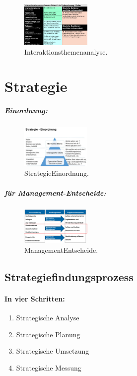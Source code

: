 \documentclass{article}
\begin{document}
\begin{figure}
\centering
\includegraphics[width=0.3\textwidth]{Resources/Image/Interaktionsthemenanalyse.png}
\caption{\label{fig:Interaktionsthemenanalyse}Interaktionsthemenanalyse.}
\end{figure}


\section{Strategie}
\subparagraph{Einordnung:}
\begin{figure}
\centering
\includegraphics[width=0.3\textwidth]{Resources/Image/StrategieEinordnung.png}
\caption{\label{fig:StrategieEinordnung}StrategieEinordnung.}
\end{figure}

\subparagraph{für Management-Entscheide:}
\begin{figure}
\centering
\includegraphics[width=0.3\textwidth]{Resources/Image/ManagementEntscheide.png}
\caption{\label{fig:ManagementEntscheide}ManagementEntscheide.}
\end{figure}


\subsection{Strategiefindungsprozess}
\paragraph{In vier Schritten:}
\begin{enumerate}
\item Strategische Analyse
\item Strategische Planung
\item Strategische Umsetzung
\item Strategische Messung
\end{enumerate}
\end{document}
